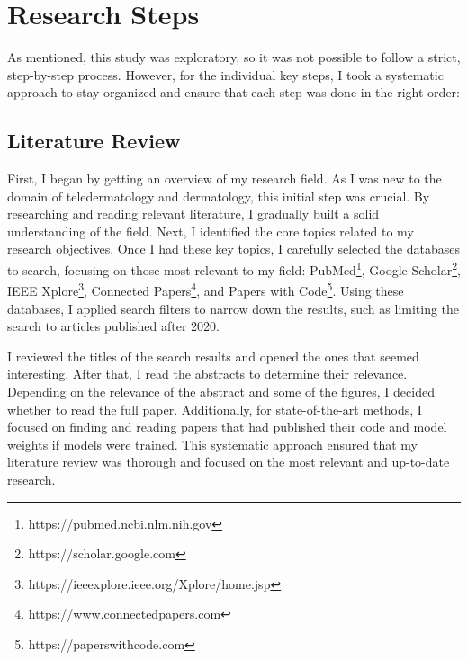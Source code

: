 \section{Research Steps}
\label{sec:ResearchSteps}
As mentioned, this study was exploratory, so it was not possible to follow a strict, step-by-step process. However, for the individual key steps, I took a systematic approach to stay organized and ensure that each step was done in the right order: \par

\subsection{Literature Review}
\label{sub:LR}
First, I began by getting an overview of my research field. As I was new to the domain of teledermatology and dermatology, this initial step was crucial. By researching and reading relevant literature, I gradually built a solid understanding of the field. Next, I identified the core topics related to my research objectives. Once I had these key topics, I carefully selected the databases to search, focusing on those most relevant to my field: PubMed\footnote{https://pubmed.ncbi.nlm.nih.gov}, Google Scholar\footnote{https://scholar.google.com}, IEEE Xplore\footnote{https://ieeexplore.ieee.org/Xplore/home.jsp}, Connected Papers\footnote{https://www.connectedpapers.com}, and Papers with Code\footnote{https://paperswithcode.com}. Using these databases, I applied search filters to narrow down the results, such as limiting the search to articles published after 2020. \par
\vspace{\baselineskip}
\noindent
I reviewed the titles of the search results and opened the ones that seemed interesting. After that, I read the abstracts to determine their relevance. Depending on the relevance of the abstract and some of the figures, I decided whether to read the full paper. Additionally, for state-of-the-art methods, I focused on finding and reading papers that had published their code and model weights if models were trained. This systematic approach ensured that my literature review was thorough and focused on the most relevant and up-to-date research. \par

